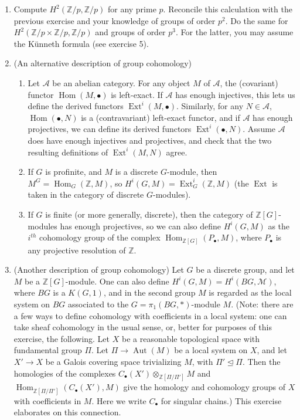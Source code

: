 \documentclass[11pt,answers,addpoints,reqno]{exam}
\theoremstyle{definition}
\theoremstyle{remark}
\theoremstyle{definition}
\theoremstyle{remark}
\theoremstyle{remark}
\theoremstyle{remark}
\newcommand{\Z}{\mathbb{Z}}
\DeclareMathOperator{\Hom}{Hom}
\DeclareMathOperator{\Ext}{Ext}
\DeclareMathOperator{\Aut}{Aut}
\newcommand{\mc}{\mathcal}
\begin{document}
\begin{enumerate}
\begin{enumerate}
\end{enumerate}
\item Compute $H^2(\Z/p, \Z/p)$ for any prime $p$. Reconcile this calculation with the previous exercise and your knowledge of groups of order $p^2$. Do the same for $H^2(\Z/p \times \Z/p, \Z/p)$ and groups of order $p^3$. For the latter, you may assume the K\"{u}nneth formula (see exercise 5).
\item (An alternative description of group cohomology)
\begin{enumerate}
\item Let $\mc{A}$ be an abelian category. For any object $M$ of $\mc{A}$, the (covariant) functor $\Hom(M, \bullet)$ is left-exact. If $\mc{A}$ has enough injectives, this lets us define the derived functors $\Ext^i(M, \bullet)$. Similarly, for any $N \in \mc{A}$, $\Hom(\bullet, N)$ is a (contravariant) left-exact functor, and if $\mc{A}$ has enough projectives, we can define its derived functors $\Ext^i(\bullet, N)$. Assume $\mc{A}$ does have enough injectives and projectives, and check that the two resulting definitions of $\Ext^i(M, N)$ agree.
\item If $G$ is profinite, and $M$ is a discrete $G$-module, then $M^G= \Hom_G(\Z, M)$, so $H^i(G, M)= \Ext^i_G(\Z, M)$ (the $\Ext$ is taken in the category of discrete $G$-modules).
\item If $G$ is finite (or more generally, discrete), then the category of $\Z[G]$-modules has enough projectives, so we can also define $H^i(G, M)$ as the $i^{th}$ cohomology group of the complex $\Hom_{\Z[G]}(P_{\bullet}, M)$, where $P_{\bullet}$ is any projective resolution of $\Z$.
\end{enumerate}
\item (Another description of group cohomology) Let $G$ be a discrete group, and let $M$ be a $\Z[G]$-module. One can also define $H^i(G, M)= H^i(BG, \mc{M})$, where $BG$ is a $K(G, 1)$, and in the second group $M$ is regarded as the local system on $BG$ associated to the $G= \pi_1(BG, \ast)$-module $M$. (Note: there are a few ways to define cohomology with coefficients in a local system: one can take sheaf cohomology in the usual sense, or, better for purposes of this exercise, the following. Let $X$ be a reasonable topological space with fundamental group $\Pi$. Let $\Pi \to \Aut(M)$ be a local system on $X$, and let $X' \to X$ be a Galois covering space trivializing $M$, with $\Pi' \unlhd \Pi$. Then the homologies of the complexes $C_{\bullet}(X') \otimes_{\Z[\Pi/\Pi']} M$ and $\Hom_{\Z[\Pi/\Pi']}(C_{\bullet}(X'), M)$ give the homology and cohomology groups of $X$ with coefficients in $M$. Here we write $C_{\bullet}$ for singular chains.) This exercise elaborates on this connection.

\end{enumerate}
\end{document}
